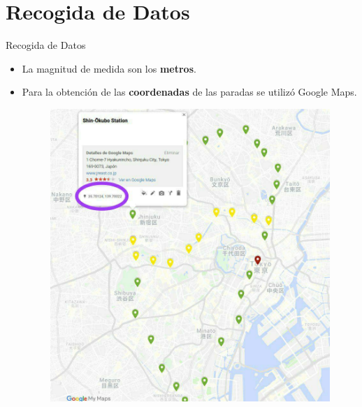 \documentclass{beamer}
\begin{document}
\section{Recogida de Datos}
\begin{frame}{Recogida de Datos}
    \begin{itemize}
      \item La magnitud de medida son los \textbf{metros}.
      \item Para la obtención de las \textbf{coordenadas} de las paradas se utilizó Google Maps.
        \begin{figure}[H]
         \centering
         \includegraphics[scale=0.25]{"../pics/coordenadas"}
        \end{figure}
    \end{itemize}
\end{frame}
\end{document}
